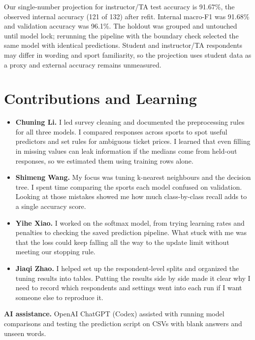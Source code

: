 \documentclass[12pt]{article}
\begin{document}
Our single-number projection for instructor/TA test accuracy is 91.67\%, the
observed internal accuracy (121 of 132) after refit. Internal macro-F1 was
91.68\% and validation accuracy was 96.1\%. The holdout was grouped and
untouched until model lock; rerunning the pipeline with the boundary check
selected the same model with identical predictions. Student and instructor/TA
respondents may differ in wording and sport familiarity, so the projection uses
student data as a proxy and external accuracy remains unmeasured.

\section{Contributions and Learning}

\begin{itemize}[itemsep=4pt]
  \item \textbf{Chuning Li.} I led survey cleaning and documented the
  preprocessing rules for all three models. I compared responses across sports
  to spot useful predictors and set rules for ambiguous ticket prices. I
  learned that even filling in missing values can leak information if the
  medians come from held-out responses, so we estimated them using training
  rows alone.
  \item \textbf{Shimeng Wang.} My focus was tuning k-nearest neighbours and the
  decision tree. I spent time comparing the sports each model confused on
  validation. Looking at those mistakes showed me how much class-by-class
  recall adds to a single accuracy score.
  \item \textbf{Yihe Xiao.} I worked on the softmax model, from trying learning
  rates and penalties to checking the saved prediction pipeline. What stuck
  with me was that the loss could keep falling all the way to the update limit
  without meeting our stopping rule.
  \item \textbf{Jiaqi Zhao.} I helped set up the respondent-level splits and
  organized the tuning results into tables. Putting the results side by side
  made it clear why I need to record which respondents and settings went into
  each run if I want someone else to reproduce it.
\end{itemize}

\textbf{AI assistance.} OpenAI ChatGPT (Codex) assisted with running model
comparisons and testing the prediction script on CSVs with blank answers and
unseen words.
\end{document}
